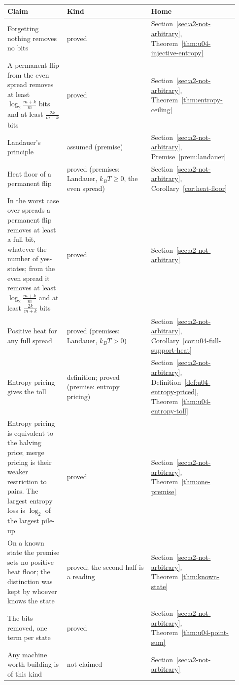 \documentclass[11pt,twoside]{article}
\theoremstyle{thielethm}
\theoremstyle{thieledef}
\theoremstyle{thieledef}
\theoremstyle{thieledef}
\theoremstyle{thielethm}
\theoremstyle{thieleobs}
\theoremstyle{thielethm}
\begin{document}
\begingroup\small
\begin{longtable}{@{}>{\raggedright\arraybackslash}p{0.242\linewidth}>{\raggedright\arraybackslash}p{0.344\linewidth}>{\raggedright\arraybackslash}p{0.344\linewidth}@{}}
\toprule
\textbf{Claim} & \textbf{Kind} & \textbf{Home} \\
\midrule
\endhead
\bottomrule
\endlastfoot
Forgetting nothing removes no bits & proved & Section~\ref{sec:a2-not-arbitrary}, Theorem~\ref{thm:u04-injective-entropy} \\
A permanent flip from the even spread removes at least $\log_2 \frac{m+k}{m}$ bits and at least $\frac{2k}{m+k}$ bits & proved & Section~\ref{sec:a2-not-arbitrary}, Theorem~\ref{thm:entropy-ceiling} \\
Landauer's principle & assumed (premise) & Section~\ref{sec:a2-not-arbitrary}, Premise~\ref{prem:landauer} \\
Heat floor of a permanent flip & proved (premises: Landauer, $k_B T \ge 0$, the even spread) & Section~\ref{sec:a2-not-arbitrary}, Corollary~\ref{cor:heat-floor} \\
In the worst case over spreads a permanent flip removes at least a full bit, whatever the number of yes-states; from the even spread it removes at least $\log_2 \frac{m+k}{m}$ and at least $\frac{2k}{m+k}$ bits & proved & Section~\ref{sec:a2-not-arbitrary} \\
Positive heat for any full spread & proved (premises: Landauer, $k_B T > 0$) & Section~\ref{sec:a2-not-arbitrary}, Corollary~\ref{cor:u04-full-support-heat} \\
Entropy pricing gives the toll & definition; proved (premise: entropy pricing) & Section~\ref{sec:a2-not-arbitrary}, Definition~\ref{def:u04-entropy-priced}, Theorem~\ref{thm:u04-entropy-toll} \\
Entropy pricing is equivalent to the halving price; merge pricing is their weaker restriction to pairs. The largest entropy loss is $\log_2$ of the largest pile-up & proved & Section~\ref{sec:a2-not-arbitrary}, Theorem~\ref{thm:one-premise} \\
On a known state the premise sets no positive heat floor; the distinction was kept by whoever knows the state & proved; the second half is a reading & Section~\ref{sec:a2-not-arbitrary}, Theorem~\ref{thm:known-state} \\
The bits removed, one term per state & proved & Section~\ref{sec:a2-not-arbitrary}, Theorem~\ref{thm:u04-point-sum} \\
Any machine worth building is of this kind & not claimed & Section~\ref{sec:a2-not-arbitrary} \\

\end{longtable}
\end{document}
